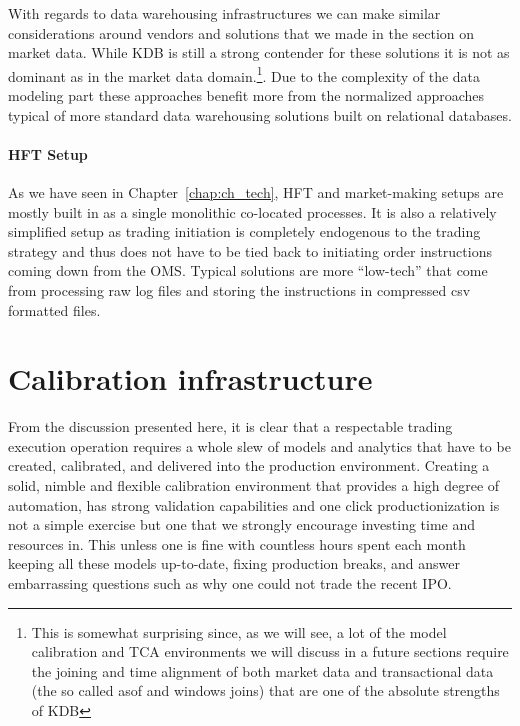 With regards to data warehousing infrastructures we can make similar considerations around vendors and solutions that we made in the section on market data. While KDB is still a strong contender for these solutions it is not as dominant as in the market data domain.\footnote{This is somewhat surprising since, as we will see, a lot of the model calibration and TCA environments we will discuss in a future sections require the joining and time alignment of both market data and transactional data (the so called asof and windows joins) that are one of the absolute strengths of KDB}. Due to the  complexity of the data modeling part these approaches benefit more from the normalized approaches typical of more standard data warehousing solutions built on relational databases. 


\paragraph{HFT Setup}

As we have seen in Chapter~\ref{chap:ch_tech}, HFT and market-making setups are mostly built in as a single monolithic co-located processes. It is also a relatively simplified setup as trading initiation is completely endogenous to the trading strategy and thus does not have to be tied back to initiating order instructions coming down from the OMS. Typical solutions are more ``low-tech'' that come from processing raw log files and storing the instructions in compressed csv formatted files.



\section{Calibration infrastructure}


From the discussion presented here, it is clear that a respectable trading execution operation requires a whole slew of models and analytics that have to be created, calibrated, and delivered into the production environment. Creating a solid, nimble and flexible calibration environment that provides a high degree of automation, has strong validation capabilities and one click productionization is not a simple exercise but one that we strongly encourage investing time and resources in. This unless one is fine with countless hours spent each month keeping all these models up-to-date, fixing production breaks, and answer embarrassing questions such as why one could not trade the recent IPO. 


